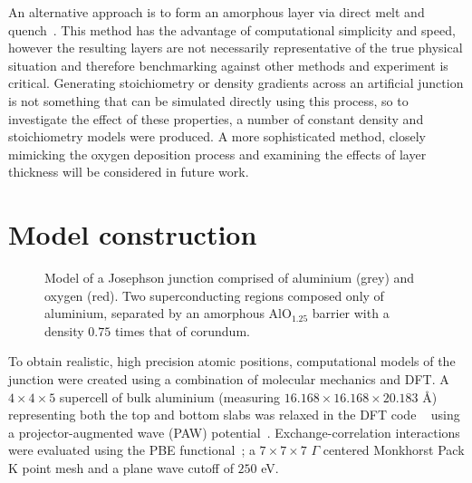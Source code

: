An alternative approach is to form an amorphous layer via direct melt and quench~\cite{Vashishta2008,Sheng2012}.
This method has the advantage of computational simplicity and speed, however the resulting layers are not necessarily representative of the true physical situation and therefore benchmarking against other methods and experiment is critical.
Generating stoichiometry or density gradients across an artificial junction is not something that can be simulated directly using this process, so to investigate the effect of these properties, a number of constant density and stoichiometry models were produced. A more sophisticated method, closely mimicking the oxygen deposition process and examining the effects of layer thickness will be considered in future work.

\section{Model construction}\label{sec:model}
\begin{figure}[tbh]
\centering
\caption{\label{fig:povray}Model of a Josephson junction comprised of aluminium (grey) and oxygen (red). Two superconducting regions composed only of aluminium, separated by an amorphous AlO$_{1.25}$ barrier with a density $0.75$ times that of corundum.}%
\end{figure}

To obtain realistic, high precision atomic positions, computational models of the junction were created using a combination of molecular mechanics and DFT. 
A $4\!\times\!4\!\times\!5$ supercell of bulk aluminium (measuring $16.168\times16.168\times20.183$ \AA) representing both the top and bottom slabs was relaxed in the DFT code ~\cite{Kresse1994, Kresse1996, Kresse1996a} using a projector-augmented wave (PAW) potential~\cite{Kresse1999, Blochl1994}.
Exchange-correlation interactions were evaluated using the PBE functional~\cite{Perdew1996}; a $7\!\times\!7\!\times\!7$ $\Gamma$ centered Monkhorst Pack K point mesh and a plane wave cutoff of $250$ eV.

